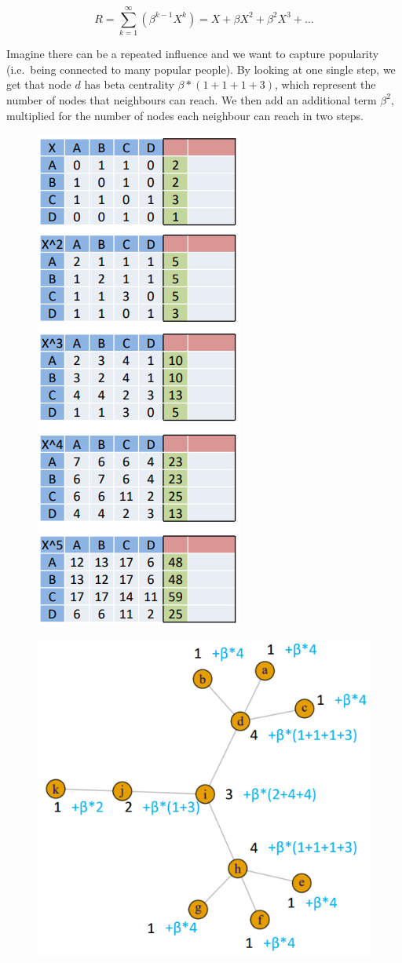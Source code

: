 \documentclass[
  notitlepage,
  onecolumn,
  openany]{book}
\begin{document}
\[
R = \sum^\infty_{k=1}(\beta^{k-1}X^k) = X+\beta X^2+\beta^2 X^3+\dots
\]

Imagine there can be a repeated influence and we want to capture popularity (i.e.~being connected to many popular people). By looking at one single step, we get that node \(d\) has beta centrality \(\beta*(1+1+1+3)\), which represent the number of nodes that neighbours can reach. We then add an additional term \(\beta^2\), multiplied for the number of nodes each neighbour can reach in two steps.

\begin{figure}[h!]

{\centering \includegraphics[width=0.3\linewidth]{images/05-Matrices and Beta centrality/Untitled 4} 

}

\end{figure}

\begin{figure}[h!]

{\centering \includegraphics[width=0.3\linewidth]{images/05-Matrices and Beta centrality/Untitled 5} 

}

\end{figure}
\end{document}
